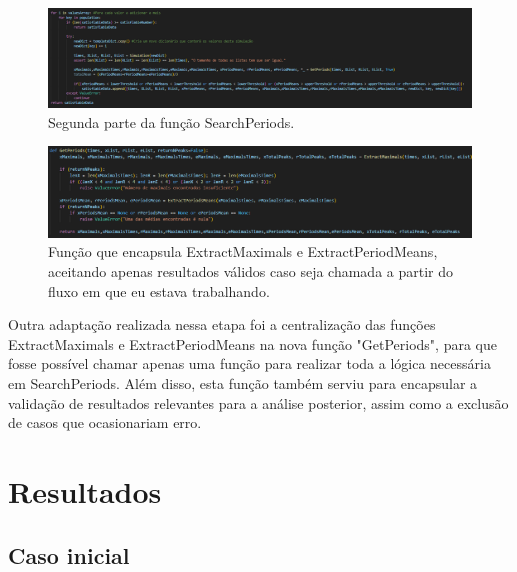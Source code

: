 \documentclass[brazilian,12pt,a4paper,final]{article}
\begin{document}
	\begin{figure}[hbtp]
		\begin{center}
			\includegraphics[width=16cm]{SearchPeriods2.png}
			\caption{Segunda parte da função SearchPeriods.}
			\label{fig}
		\end{center}
	\end{figure}
	
	\begin{figure}[hbtp]
		\begin{center}
			\includegraphics[width=16cm]{GetPeriods.png}
			\caption{Função que encapsula ExtractMaximals e ExtractPeriodMeans, aceitando apenas resultados válidos caso seja chamada a partir do fluxo em que eu estava trabalhando.}
			\label{fig}
		\end{center}
	\end{figure}
	
	Outra adaptação realizada nessa etapa foi a centralização das funções ExtractMaximals e ExtractPeriodMeans na nova função "GetPeriods", para que fosse possível chamar apenas uma função para realizar toda a lógica necessária em SearchPeriods. Além disso, esta função também serviu para encapsular a validação de resultados relevantes para a análise posterior, assim como a exclusão de casos que ocasionariam erro.
	
	\section{Resultados}
	\subsection{Caso inicial}
	
\end{document}
